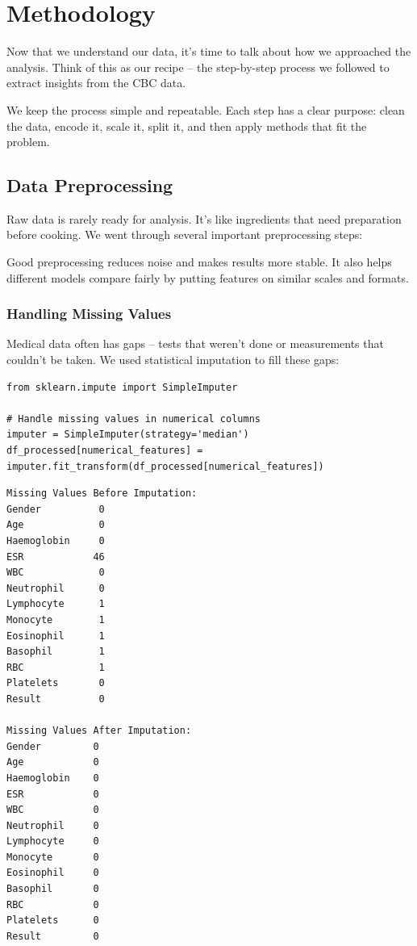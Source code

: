 \documentclass[12pt,a4paper]{article}
\begin{document}
\section{Methodology}

Now that we understand our data, it's time to talk about how we approached the analysis. Think of this as our recipe – the step-by-step process we followed to extract insights from the CBC data.

We keep the process simple and repeatable. Each step has a clear purpose: clean the data, encode it, scale it, split it, and then apply methods that fit the problem.

\subsection{Data Preprocessing}

Raw data is rarely ready for analysis. It's like ingredients that need preparation before cooking. We went through several important preprocessing steps:

Good preprocessing reduces noise and makes results more stable. It also helps different models compare fairly by putting features on similar scales and formats.

\subsubsection{Handling Missing Values}

Medical data often has gaps – tests that weren't done or measurements that couldn't be taken. We used statistical imputation to fill these gaps:

\begin{lstlisting}
from sklearn.impute import SimpleImputer

# Handle missing values in numerical columns
imputer = SimpleImputer(strategy='median')
df_processed[numerical_features] = imputer.fit_transform(df_processed[numerical_features])
\end{lstlisting}

\begin{verbatim}
Missing Values Before Imputation:
Gender          0
Age             0
Haemoglobin     0
ESR            46
WBC             0
Neutrophil      0
Lymphocyte      1
Monocyte        1
Eosinophil      1
Basophil        1
RBC             1
Platelets       0
Result          0

Missing Values After Imputation:
Gender         0
Age            0
Haemoglobin    0
ESR            0
WBC            0
Neutrophil     0
Lymphocyte     0
Monocyte       0
Eosinophil     0
Basophil       0
RBC            0
Platelets      0
Result         0
\end{verbatim}
\end{document}
